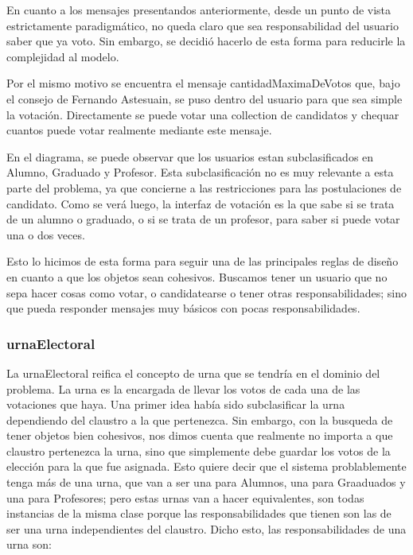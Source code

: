 En cuanto a los mensajes presentandos anteriormente, desde un punto de vista estrictamente paradigm\'atico, no queda claro que sea responsabilidad del usuario saber que ya voto. Sin embargo, se decidi\'o hacerlo de esta forma para reducirle la complejidad al modelo.

Por el mismo motivo se encuentra el mensaje cantidadMaximaDeVotos que, bajo el consejo de Fernando Astesuain, se puso dentro del usuario para que sea simple la votaci\'on. Directamente se puede votar una collection de candidatos y chequar cuantos puede votar realmente mediante este mensaje.

En el diagrama, se puede observar que los usuarios estan subclasificados en Alumno, Graduado y Profesor. Esta subclasificaci\'on no es muy relevante a esta parte del problema, ya que concierne a las restricciones para las postulaciones de candidato. Como se ver\'a luego, la interfaz de votaci\'on es la que sabe si se trata de un alumno o graduado, o si se trata de un profesor, para saber si puede votar una o dos veces.

Esto lo hicimos de esta forma para seguir una de las principales reglas de diseño en cuanto a que los objetos sean cohesivos. Buscamos tener un usuario que no sepa hacer cosas como votar, o candidatearse o tener otras responsabilidades; sino que pueda responder mensajes muy b\'asicos con pocas responsabilidades.

\subsubsection{urnaElectoral}

La urnaElectoral reifica el concepto de urna que se tendr\'ia en el dominio del problema. La urna es la encargada de llevar los votos de cada una de las votaciones que haya. Una primer idea hab\'ia sido subclasificar la urna dependiendo del claustro a la que pertenezca. Sin embargo, con la busqueda de tener objetos bien cohesivos, nos dimos cuenta que realmente no importa a que claustro pertenezca la urna, sino que simplemente debe guardar los votos de la elecci\'on para la que fue asignada. Esto quiere decir que el sistema problablemente tenga m\'as de una urna, que van a ser una para Alumnos, una para Graaduados y una para Profesores; pero estas urnas van a hacer equivalentes, son todas instancias de la misma clase porque las responsabilidades que tienen son las de ser una urna independientes del claustro. Dicho esto, las responsabilidades de una urna son:

